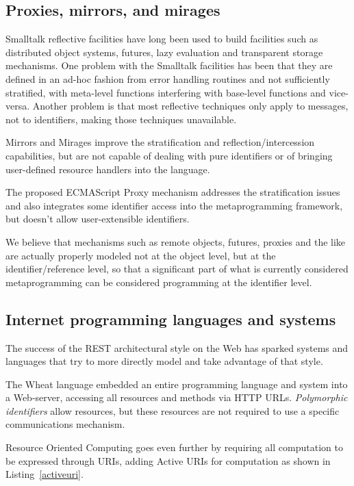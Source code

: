 \documentclass[preprint,authoryear]{acm_proc_article-sp}
\begin{document}
\subsection{Proxies, mirrors, and mirages}

Smalltalk reflective facilities \cite{reflective-st} have long been used to build
facilities such as distributed object systems, futures, lazy evaluation and
transparent storage mechanisms.  One problem with the Smalltalk facilities
has been that they are defined in an ad-hoc fashion from error handling routines
and not sufficiently stratified, with meta-level functions
interfering with base-level functions and vice-versa.  Another problem is that
most reflective techniques only apply to messages, not to identifiers, making 
those techniques unavailable.

Mirrors \cite{mirrors} and Mirages \cite{mirages} improve the stratification and
reflection/intercession capabilities, but are not capable of dealing with pure
identifiers or of bringing user-defined resource handlers into the language.

The proposed ECMAScript Proxy mechanism \cite{VanCutsemMiller} addresses
the stratification issues and also integrates some identifier access into the 
metaprogramming framework, but doesn't allow user-extensible identifiers.

We believe that mechanisms such as remote objects, futures, proxies and the like
are actually properly modeled not at the object level, but at the identifier/reference
level, so that a significant part of what is currently considered metaprogramming
can be considered programming at the identifier level.

\subsection{Internet programming languages and systems}

The success of the REST architectural style\cite{fielding-rest} on the Web has sparked
systems and languages that try to more directly model and take advantage of that
style.

The Wheat language \cite{wheat} embedded an entire programming language
and system into a Web-server, accessing all resources and methods via
HTTP URLs.  \emph{Polymorphic identifiers} allow resources, but these resources
are not required to use a specific communications mechanism.


Resource Oriented Computing \cite{roc} goes even further by
requiring all computation to be expressed through URIs, adding Active URIs
for computation as shown in Listing~\ref{activeuri}.   
\end{document}
